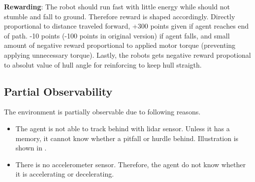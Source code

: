 \textbf{Rewarding}: The robot should run fast with little energy while should not stumble and fall to ground. Therefore reward is shaped accordingly. Directly proportional to distance traveled forward, +300 points given if agent reaches end of path. -10 points (-100 points in original version)  if agent falls, and small amount of negative reward proportional to applied motor torque (preventing applying unnecessary torque). Lastly, the robots gets negative reward propotional to absolut value of hull angle for reinforcing to keep hull straigth. \\
\subsection{Partial Observability}
The environment is partially observable due to following reasons.
\begin{itemize}
	\item The agent is not able to track behind with lidar sensor. Unless it has a memory, it cannot know whether a pitfall or hurdle behind. Illustration is shown in .
	\item There is no accelerometer sensor. Therefore, the agent do not know whether it is accelerating or decelerating.
\end{itemize}
